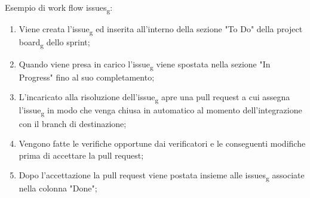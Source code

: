 \begin{itemize}
\\\\
Esempio di work flow issues\textsubscript{g}:
\begin{enumerate}
	\item Viene creata l'issue\textsubscript{g} ed inserita all'interno della sezione "To Do" della project board\textsubscript{g} dello sprint;
	\item Quando viene presa in carico l'issue\textsubscript{g} viene spostata nella sezione "In Progress" fino al suo completamento;
	\item L'incaricato alla risoluzione dell'issue\textsubscript{g} apre una pull request a cui assegna l'issue\textsubscript{g} in modo che  venga chiusa in automatico al momento dell'integrazione con il branch di destinazione;
	\item Vengono fatte le verifiche opportune dai verificatori e le conseguenti modifiche prima di accettare la pull request;
	\item Dopo l'accettazione la pull request viene postata insieme alle issues\textsubscript{g} associate nella colonna "Done";
\end{enumerate}

\end{itemize}
